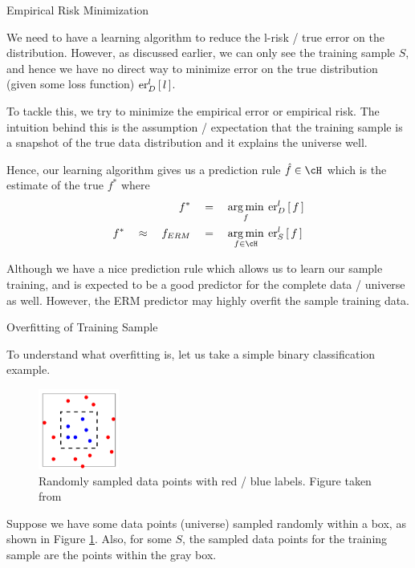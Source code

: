 \documentclass[11pt,a4paper]{article}
\begin{document}
\begin{ssection}{Empirical Risk Minimization}

	We need to have a learning algorithm to reduce the l-risk / true error on the distribution. However, as discussed earlier, we can only see the training sample $S$, and hence we have no direct way to minimize error on the true distribution (given some loss function)  $\err[_D^l]{l}$.

	To tackle this, we try to minimize the empirical error or empirical risk. The intuition behind this is the assumption / expectation that the training sample is a snapshot of the true data distribution and it explains the universe well.

	Hence, our learning algorithm gives us a prediction rule $\hat{f} \in \cH$ which is the estimate of the true $f^\ast$ where
	\begin{align*}
		f^\ast					&\eq	\argmin{f} \err[_D^l]{f} \\
		f^\ast \qapprox f_{ERM}	&\eq	\argmin{f \in \cH} \err[_S^l]{f}
	\end{align*}

	Although we have a nice prediction rule which allows us to learn our sample training, and is expected to be a good predictor for the complete data / universe as well. However, the ERM predictor may highly overfit the sample training data.

	\begin{ssubsection}{Overfitting of Training Sample}

		To understand what overfitting is, let us take a simple binary classification example.

		\begin{figure}[h!]
			\centering
			\includegraphics[height=100px]{includes/overfitting-example.png}
			\caption{Randomly sampled data points with red / blue labels. Figure taken from \cite{ml-tta}}
			\label{fig:overfitting}
		\end{figure}

		Suppose we have some data points (universe) sampled randomly within a box, as shown in Figure \ref{fig:overfitting}. Also, for some $S$, the sampled data points for the training sample are the points within the gray box.


\end{ssubsection}
\end{ssection}
\end{document}
